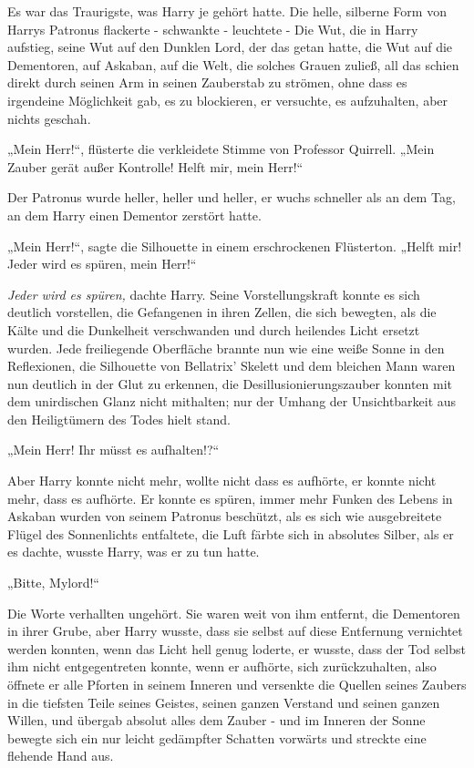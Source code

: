 {Es war das Traurigste, was Harry je gehört hatte. Die helle, silberne Form von Harrys Patronus flackerte - schwankte - leuchtete - Die Wut, die in Harry aufstieg, seine Wut auf den Dunklen Lord, der das getan hatte, die Wut auf die Dementoren, auf Askaban, auf die Welt, die solches Grauen zuließ, all das schien direkt durch seinen Arm in seinen Zauberstab zu strömen, ohne dass es irgendeine Möglichkeit gab, es zu blockieren, er versuchte, es aufzuhalten, aber nichts geschah.

„Mein Herr!“, flüsterte die verkleidete Stimme von Professor Quirrell. „Mein Zauber gerät außer Kontrolle! Helft mir, mein Herr!“

Der Patronus wurde heller, heller und heller, er wuchs schneller als an dem Tag, an dem Harry einen Dementor zerstört hatte.

„Mein Herr!“, sagte die Silhouette in einem erschrockenen Flüsterton. „Helft mir! Jeder wird es spüren, mein Herr!“

\emph{Jeder wird es spüren,} dachte Harry. Seine Vorstellungskraft konnte es sich deutlich vorstellen, die Gefangenen in ihren Zellen, die sich bewegten, als die Kälte und die Dunkelheit verschwanden und durch heilendes Licht ersetzt wurden. Jede freiliegende Oberfläche brannte nun wie eine weiße Sonne in den Reflexionen, die Silhouette von Bellatrix' Skelett und dem bleichen Mann waren nun deutlich in der Glut zu erkennen, die Desillusionierungszauber konnten mit dem unirdischen Glanz nicht mithalten; nur der Umhang der Unsichtbarkeit aus den Heiligtümern des Todes hielt stand.

„Mein Herr! Ihr müsst es aufhalten!?“

Aber Harry konnte nicht mehr, wollte nicht dass es aufhörte, er konnte nicht mehr, dass es aufhörte. Er konnte es spüren, immer mehr Funken des Lebens in Askaban wurden von seinem Patronus beschützt, als es sich wie ausgebreitete Flügel des Sonnenlichts entfaltete, die Luft färbte sich in absolutes Silber, als er es dachte, wusste Harry, was er zu tun hatte.

„Bitte, Mylord!“

Die Worte verhallten ungehört. Sie waren weit von ihm entfernt, die Dementoren in ihrer Grube, aber Harry wusste, dass sie selbst auf diese Entfernung vernichtet werden konnten, wenn das Licht hell genug loderte, er wusste, dass der Tod selbst ihm nicht entgegentreten konnte, wenn er aufhörte, sich zurückzuhalten, also öffnete er alle Pforten in seinem Inneren und versenkte die Quellen seines Zaubers in die tiefsten Teile seines Geistes, seinen ganzen Verstand und seinen ganzen Willen, und übergab absolut alles dem Zauber - und im Inneren der Sonne bewegte sich ein nur leicht gedämpfter Schatten vorwärts und streckte eine flehende Hand aus.

}
